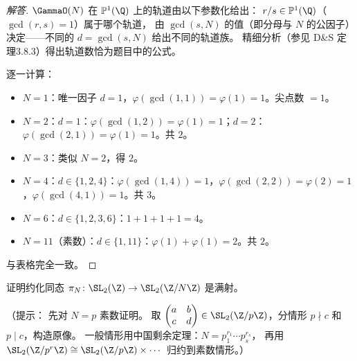\begin{proof}[解答]
$\GammaO(N)$ 在 $\mathbb{P}^1(\Q)$ 上的轨道由以下参数化给出：
$r/s \in \mathbb{P}^1(\Q)$（$\gcd(r,s)=1$）属于哪个轨道，
由 $\gcd(s, N)$ 的值（即分母与 $N$ 的公因子）决定——不同的 $d = \gcd(s,N)$ 给出不同的轨道族。
精细分析（参见 D\&S 定理3.8.3）得出轨道数恰为题目中的公式。

逐一计算：
\begin{itemize}
  \item $N=1$：唯一因子 $d=1$，$\varphi(\gcd(1,1))=\varphi(1)=1$。尖点数 $= 1$。
  \item $N=2$：$d=1$：$\varphi(\gcd(1,2))=\varphi(1)=1$；$d=2$：$\varphi(\gcd(2,1))=\varphi(1)=1$。共 $2$。
  \item $N=3$：类似 $N=2$，得 $2$。
  \item $N=4$：$d \in \{1,2,4\}$：$\varphi(\gcd(1,4))=1$，$\varphi(\gcd(2,2))=\varphi(2)=1$，$\varphi(\gcd(4,1))=1$。共 $3$。
  \item $N=6$：$d \in \{1,2,3,6\}$：$1 + 1 + 1 + 1 = 4$。
  \item $N=11$（素数）：$d \in \{1,11\}$：$\varphi(1)+\varphi(1)=2$。共 $2$。
\end{itemize}
与表格完全一致。\qedhere
\end{proof}

\begin{exercise}
\label{ex:ch1-surjection-slnz}
证明约化同态 $\pi_N \colon \SL_2(\Z) \to \SL_2(\Z/N\Z)$ 是满射。

（提示：
先对 $N = p$ 素数证明。
取 $\begin{pmatrix}a&b\\c&d\end{pmatrix} \in \SL_2(\Z/p\Z)$，分情形 $p \nmid c$ 和 $p \mid c$，构造原像。
一般情形用中国剩余定理：$N = p_1^{r_1} \cdots p_s^{r_s}$，
再用 $\SL_2(\Z/p^r\Z) \cong \SL_2(\Z/p\Z) \times \cdots$ 归约到素数情形。）
\end{exercise}


